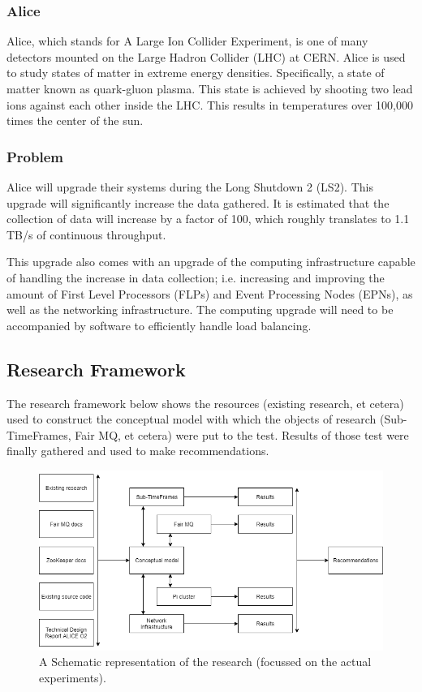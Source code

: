 \documentclass[]{article}
\begin{document}
\subsubsection{Alice}
Alice, which stands for A Large Ion Collider Experiment, is one of many detectors mounted on the Large Hadron Collider (LHC) at CERN. Alice is used to study states of matter in extreme energy densities. Specifically, a state of matter known as quark-gluon plasma. This state is achieved by shooting two lead ions against each other inside the LHC. This results in temperatures over 100,000 times the center of the sun.

\subsubsection{Problem}
Alice will upgrade their systems during the Long Shutdown 2 (LS2). This upgrade will significantly increase the data gathered. It is estimated that the collection of data will increase by a factor of 100, which roughly translates to 1.1 TB/s of continuous throughput.

This upgrade also comes with an upgrade of the computing infrastructure capable of handling the increase in data collection; i.e. increasing and improving the amount of First Level Processors (FLPs) and Event Processing Nodes (EPNs), as well as the networking infrastructure. The computing upgrade will need to be accompanied by software to efficiently handle load balancing.

\subsection{Research Framework}
The research framework below shows the resources (existing research, et cetera) used to construct the conceptual model with which the objects of research (Sub-TimeFrames, Fair MQ, et cetera) were put to the test. Results of those test were finally gathered and used to make recommendations.

\begin{center}
	\begin{figure}[H]
		\includegraphics[width=\textwidth]{images/research-model}
		\caption{A Schematic representation of the research (focussed on the actual experiments).}
		\label{fig:ssh}
	\end{figure}
\end{center}
\end{document}
